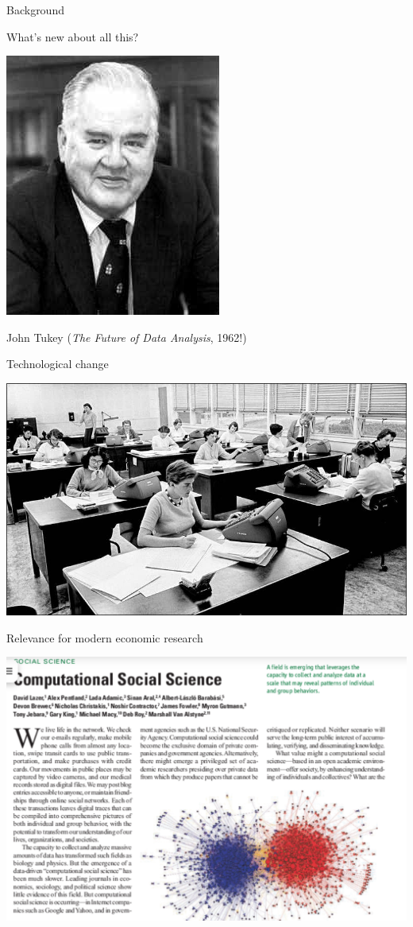 \documentclass[
  ignorenonframetext,
]{beamer}
\begin{document}
\begin{frame}{Background}
\begin{block}{What's new about all this?}
\protect\hypertarget{whats-new-about-all-this-2}{}
\begin{center}\includegraphics[width=0.4\linewidth]{../../img/tukey} \end{center}

John Tukey (\emph{The Future of Data Analysis}, 1962!)
\end{block}

\begin{block}{Technological change}
\protect\hypertarget{technological-change}{}
\begin{center}\includegraphics[width=0.9\linewidth]{../../img/computers} \end{center}
\end{block}

\begin{block}{Relevance for modern economic research}
\protect\hypertarget{relevance-for-modern-economic-research}{}
\begin{center}\includegraphics[width=0.9\linewidth]{../../img/css} \end{center}
\end{block}


\end{frame}
\end{document}
